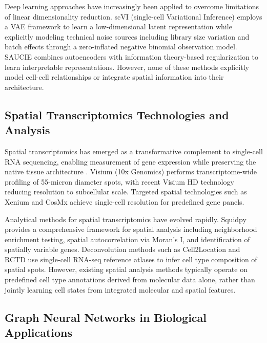 \documentclass{article}
\begin{document}
Deep learning approaches have increasingly been applied to overcome limitations of linear dimensionality reduction. scVI (single-cell Variational Inference) \citep{lopez2018deep} employs a VAE framework to learn a low-dimensional latent representation while explicitly modeling technical noise sources including library size variation and batch effects through a zero-inflated negative binomial observation model. SAUCIE \citep{amodio2019exploring} combines autoencoders with information theory-based regularization to learn interpretable representations. However, none of these methods explicitly model cell-cell relationships or integrate spatial information into their architecture.

\subsection{Spatial Transcriptomics Technologies and Analysis}

Spatial transcriptomics has emerged as a transformative complement to single-cell RNA sequencing, enabling measurement of gene expression while preserving the native tissue architecture \citep{moses2022museum}. Visium (10x Genomics) performs transcriptome-wide profiling of 55-micron diameter spots, with recent Visium HD technology reducing resolution to subcellular scale. Targeted spatial technologies such as Xenium and CosMx achieve single-cell resolution for predefined gene panels.

Analytical methods for spatial transcriptomics have evolved rapidly. Squidpy \citep{palla2022squidpy} provides a comprehensive framework for spatial analysis including neighborhood enrichment testing, spatial autocorrelation via Moran's I, and identification of spatially variable genes. Deconvolution methods such as Cell2Location \citep{kleshchevnikov2022cell2location} and RCTD \citep{cable2022robust} use single-cell RNA-seq reference atlases to infer cell type composition of spatial spots. However, existing spatial analysis methods typically operate on predefined cell type annotations derived from molecular data alone, rather than jointly learning cell states from integrated molecular and spatial features.

\subsection{Graph Neural Networks in Biological Applications}
\end{document}
